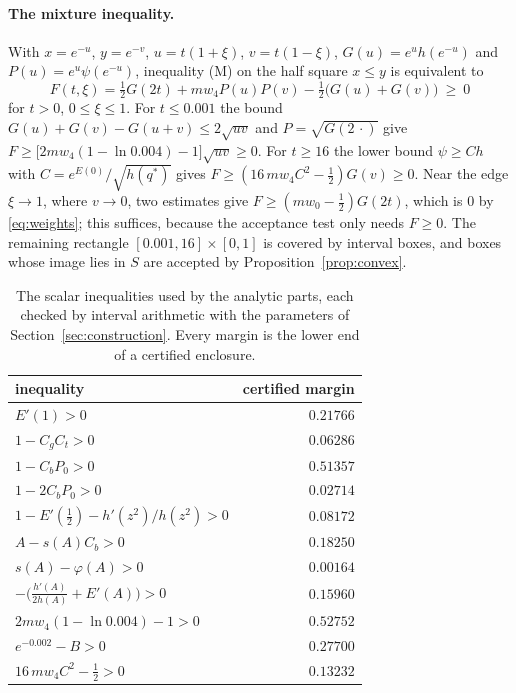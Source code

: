\documentclass[aps,prd,twocolumn,superscriptaddress,nofootinbib,longbibliography,floatfix,amsmath,amssymb,10pt]{revtex4-2}
\theoremstyle{plain}
\theoremstyle{definition}
\theoremstyle{plain}
\newcommand{\qs}{q^{*}}
\begin{document}
\paragraph*{The mixture inequality.} With $x=e^{-u}$, $y=e^{-v}$, $u=t(1+\xi)$, $v=t(1-\xi)$, $G(u)=e^{u}h(e^{-u})$ and $P(u)=e^{u}\psi(e^{-u})$, inequality (M) on the half square $x\le y$ is equivalent to
\begin{equation}\label{eq:F}
F(t,\xi)=\tfrac12G(2t)+mw_4P(u)P(v)-\tfrac12\bigl(G(u)+G(v)\bigr)\ \ge\ 0
\end{equation}
for $t>0$, $0\le\xi\le1$. For $t\le 0.001$ the bound $G(u)+G(v)-G(u+v)\le 2\sqrt{uv}$ and $P=\sqrt{G(2\,\cdot)}$ give $F\ge\bigl[2mw_4(1-\ln 0.004)-1\bigr]\sqrt{uv}\ge0$. For $t\ge 16$ the lower bound $\psi\ge C h$ with $C=e^{E(0)}/\sqrt{h(\qs)}$ gives $F\ge(16\,mw_4C^2-\frac12)G(v)\ge0$. Near the edge $\xi\to 1$, where $v\to 0$, two estimates give $F\ge(mw_0-\frac12)G(2t)$, which is $0$ by \eqref{eq:weights}; this suffices, because the acceptance test only needs $F\ge 0$. The remaining rectangle $[0.001,16]\times[0,1]$ is covered by interval boxes, and boxes whose image lies in $S$ are accepted by Proposition~\ref{prop:convex}.

\begin{table}[t]
\centering
\caption{The scalar inequalities used by the analytic parts, each checked by interval arithmetic with the parameters of Section~\ref{sec:construction}. Every margin is the lower end of a certified enclosure.}
\label{tab:scalars}
\begin{tabular}{lr}
\toprule
inequality & certified margin\\
\midrule
$E'(1)>0$ & $0.21766$\\
$1-C_gC_t>0$ & $0.06286$\\
$1-C_bP_0>0$ & $0.51357$\\
$1-2C_bP_0>0$ & $0.02714$\\
$1-E'(\frac12)-h'(z^2)/h(z^2)>0$ & $0.08172$\\
$A-s(A)C_b>0$ & $0.18250$\\
$s(A)-\varphi(A)>0$ & $0.00164$\\
$-\bigl(\frac{h'(A)}{2h(A)}+E'(A)\bigr)>0$ & $0.15960$\\
$2mw_4(1-\ln 0.004)-1>0$ & $0.52752$\\
$e^{-0.002}-B>0$ & $0.27700$\\
$16\,mw_4C^2-\frac12>0$ & $0.13232$\\
\bottomrule
\end{tabular}
\end{table}
\end{document}
